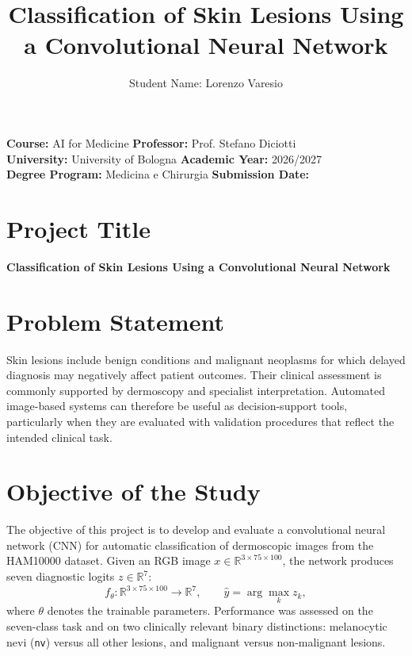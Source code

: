 \documentclass[11pt,a4paper]{article}
\title{\textbf{Classification of Skin Lesions Using a Convolutional Neural Network}}
\author{Student Name: Lorenzo Varesio}
\date{}
\begin{document}
\maketitle
\vspace{-0.7cm}
\noindent
\textbf{Course:} AI for Medicine \quad
\textbf{Professor:} Prof. Stefano Diciotti \\
\textbf{University:} University of Bologna \quad
\textbf{Academic Year:} 2026/2027 \\
\textbf{Degree Program:} Medicina e Chirurgia \quad
\textbf{Submission Date:} \underline{\hspace{3cm}}
\vspace{0.15cm}

\section{Project Title}
\textbf{Classification of Skin Lesions Using a Convolutional Neural Network}

\section{Problem Statement}
Skin lesions include benign conditions and malignant neoplasms for which delayed diagnosis may negatively affect patient outcomes. Their clinical assessment is commonly supported by dermoscopy and specialist interpretation. Automated image-based systems can therefore be useful as decision-support tools, particularly when they are evaluated with validation procedures that reflect the intended clinical task.

\section{Objective of the Study}
The objective of this project is to develop and evaluate a convolutional neural network (CNN) for automatic classification of dermoscopic images from the HAM10000 dataset. Given an RGB image $x\in\mathbb{R}^{3\times75\times100}$, the network produces seven diagnostic logits $z\in\mathbb{R}^{7}$:
\[
f_{\theta}:\mathbb{R}^{3\times75\times100}\rightarrow\mathbb{R}^{7},
\qquad \hat y=\arg\max_k z_k,
\]
where $\theta$ denotes the trainable parameters. Performance was assessed on the seven-class task and on two clinically relevant binary distinctions: melanocytic nevi (\texttt{nv}) versus all other lesions, and malignant versus non-malignant lesions.
\end{document}
